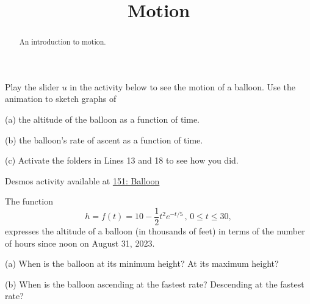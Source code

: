 \documentclass{ximera}
\title{Motion}
\begin{document}
\begin{abstract}
An introduction to motion.
\end{abstract}
\maketitle


\begin{question}  \label{Q:4sdfdsfdellk}

Play the slider $u$ in the activity below to see the motion of a balloon. Use the animation to sketch graphs of

(a) the altitude of the balloon as a function of time.

(b) the balloon's rate of ascent as a function of time.

(c) Activate the folders in Lines 13 and 18 to see how you did.

\begin{onlineOnly}
    \begin{center}
\end{center}
\end{onlineOnly}

Desmos activity available at \href{https://www.desmos.com/calculator/jl0nyqwukz}{151: Balloon}

\end{question}


\begin{question}  \label{QDfsdtegg}
The function
\[
     h = f(t) = 10 - \frac{1}{2}t^2 e^{-t/5} \, , \, 0\leq t \leq 30,
\]
expresses the altitude of a balloon (in thousands of feet) in terms of the number of hours since noon on August 31, 2023.

(a) When is the balloon at its minimum height? At its maximum height?

(b) When is the balloon ascending at the fastest rate? Descending at the fastest rate? 

\end{question}
\end{document}

